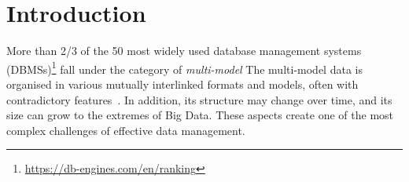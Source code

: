 
\section{Introduction}

More than 2/3 of the 50 most widely used database management systems (DBMSs)\footnote{\url{https://db-engines.com/en/ranking}} fall under the category of \textit{multi-model} The multi-model data is organised in various mutually interlinked formats and models, often with
contradictory features~\citep{CSUR-Jiaheng}. In addition, its structure may change over time, and its size can grow to the extremes of Big Data. These aspects create one of the
most complex challenges of effective data management.

